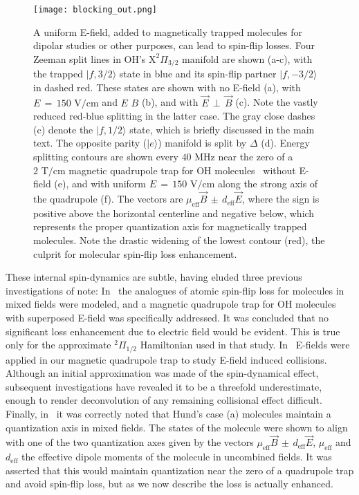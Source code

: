\documentclass[%
 reprint,
 amsmath,amssymb,
 aps,
prl,
]{revtex4-1}
\newcommand{\epb}{{$\vec{E}\,{\perp}\,\vec{B}$}}
\begin{document}
\begin{figure}[tb]
\texttt{[image: blocking\_out.png]}%
\caption{
A uniform E-field, added to magnetically trapped molecules for dipolar studies or other purposes, can lead to spin-flip losses. 
Four Zeeman split lines in OH's $\mathrm{X}^2\Pi_{3/2}$ manifold are shown (a-c), with the trapped $|f,3/2\rangle$ state in blue and its spin-flip partner $|f,-3/2\rangle$ in dashed red. 
These states are shown with no E-field (a), with $E\,{=}\,150\text{ V/cm}$ and $E\,$\raisebox{1px}{${\parallel}$}$\,B$ (b), and with \epb{} (c). 
Note the vastly reduced red-blue splitting in the latter case. 
The gray close dashes (c) denote the $|f,1/2\rangle$ state, which is briefly discussed in the main text.
The opposite parity ($|e\rangle$) manifold is split by $\Delta$ (d). 
Energy splitting contours are shown every $40\text{ MHz}$ near the zero of a $2\text{ T/cm}$ magnetic quadrupole trap for OH molecules~\cite{Stuhl2012uwave} without E-field (e), and with uniform $E\,{=}\,150\text{ V/cm}$ along the strong axis of the quadrupole (f). 
The vectors are $\mu_\text{eff}\vec{B}\,{\pm}\, d_\text{eff}\vec{E}$, where the sign is positive above the horizontal centerline and negative below, which  represents the proper quantization axis for magnetically trapped molecules. 
Note the drastic widening of the lowest contour (red), the culprit for molecular spin-flip loss enhancement.
}
\label{fig:blocking}
\end{figure}

These internal spin-dynamics are subtle, having eluded three previous investigations of note: In~\cite{Lara2008} the analogues of atomic spin-flip loss for molecules in mixed fields were modeled, and a magnetic quadrupole trap for OH molecules with superposed E-field was specifically addressed. 
It was concluded that no significant loss enhancement due to electric field would be evident. 
This is true only for the approximate $^2\Pi_{1/2}$ Hamiltonian used in that study. 
In~\cite{Stuhl2013} E-fields were applied in our magnetic quadrupole trap to study E-field induced collisions. 
Although an initial approximation was made of the spin-dynamical effect, subsequent investigations have revealed it to be a threefold underestimate, enough to render deconvolution of any remaining collisional effect difficult. 
Finally, in~\cite{Bohn2013} it was correctly noted that Hund's case (a) molecules maintain a quantization axis in mixed fields. 
The states of the molecule were shown to align with one of the two quantization axes given by the vectors $\mu_\text{eff}\vec{B}\,{\pm}\, d_\text{eff}\vec{E}$, $\mu_\text{eff}$ and $d_\text{eff}$ the effective dipole moments of the molecule in uncombined fields. 
It was asserted that this would maintain quantization near the zero of a quadrupole trap and avoid spin-flip loss, but as we now describe the loss is actually enhanced.
\end{document}
